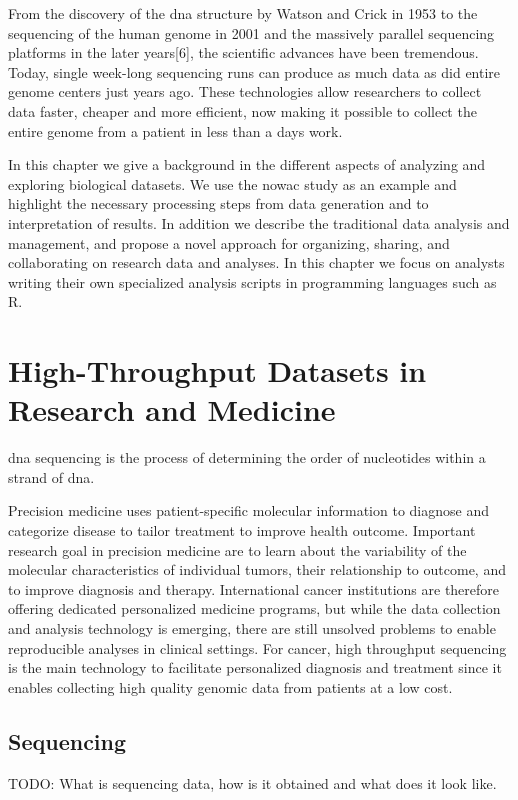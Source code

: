 From the discovery of the \gls{dna} structure by Watson and Crick in
1953\cite{watson1953molecular} to the sequencing of the human genome in 2001
\cite{venter2001sequence,international2001initial} and the massively parallel
sequencing platforms in the later years[6], the scientific advances have been
tremendous. Today, single week-long sequencing runs can produce as much data as
did entire genome centers just years ago.\cite{kahn2011future}  These
technologies allow researchers to collect data faster, cheaper and more
efficient, now making it possible to collect the entire genome from a patient in
less than a days work.

In this chapter we give a background in the different aspects of analyzing and
exploring biological datasets. We use the \gls{nowac} study as an example and
highlight the necessary processing steps from data generation and to
interpretation of results. In addition we describe the traditional data analysis
and management, and propose a novel approach for organizing, sharing, and
collaborating on research data and analyses. In this chapter we focus on
analysts writing their own specialized analysis scripts in programming languages
such as R. 

\section{High-Throughput Datasets in Research and Medicine} 
\gls{dna} sequencing is the process of determining the order of nucleotides
within a strand of \gls{dna}. 

Precision medicine uses patient-specific molecular information to diagnose and
categorize disease to tailor treatment to improve health
outcome.\cite{national2011toward} Important research goal in precision medicine
are to learn about the variability of the molecular characteristics of
individual tumors, their relationship to outcome, and to improve diagnosis and
therapy.\cite{tannock2016limits} International cancer institutions are therefore
offering dedicated personalized medicine programs, but while the data collection
and analysis technology is emerging, there are still unsolved problems to enable
reproducible analyses in clinical settings. For cancer, high throughput
sequencing is the main technology to facilitate personalized diagnosis and
treatment since it enables collecting high quality genomic data from patients
at a low cost. 

\subsection{Sequencing} 
TODO: What is sequencing data, how is it obtained and what does it look like. 
